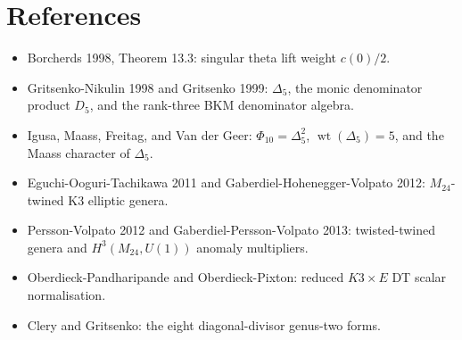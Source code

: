 \documentclass[11pt]{article}
\providecommand{\wt}{\operatorname{wt}}
\providecommand{\Mtf}{M_{24}}
\providecommand{\Dfive}{\Delta_5}
\providecommand{\Phiten}{\Phi_{10}}
\begin{document}
\section{References}

\begin{itemize}
\item Borcherds 1998, Theorem 13.3: singular theta lift weight
\(c(0)/2\).
\item Gritsenko-Nikulin 1998 and Gritsenko 1999: \(\Dfive\),
the monic denominator product \(D_5\), and the rank-three BKM
denominator algebra.
\item Igusa, Maass, Freitag, and Van der Geer: \(\Phiten=\Dfive^2\),
\(\wt(\Dfive)=5\), and the Maass character of \(\Dfive\).
\item Eguchi-Ooguri-Tachikawa 2011 and Gaberdiel-Hohenegger-Volpato
2012: \(M_{24}\)-twined K3 elliptic genera.
\item Persson-Volpato 2012 and Gaberdiel-Persson-Volpato 2013:
twisted-twined genera and \(H^3(\Mtf,U(1))\) anomaly multipliers.
\item Oberdieck-Pandharipande and Oberdieck-Pixton: reduced
\(K3\times E\) DT scalar normalisation.
\item Clery and Gritsenko: the eight diagonal-divisor genus-two forms.
\end{itemize}
\end{document}
